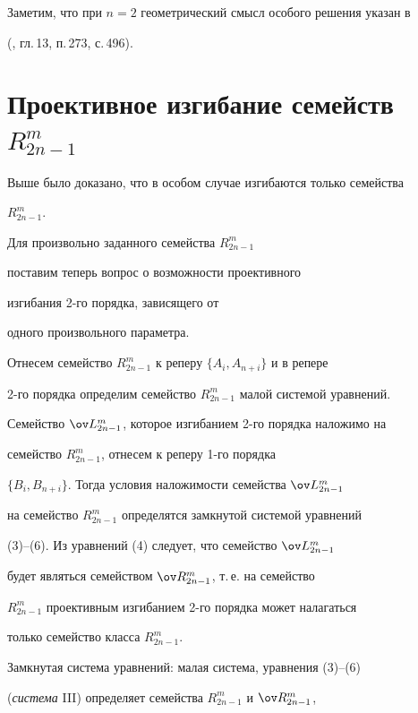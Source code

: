  


Заметим, что при $n=2$ геометрический смысл особого решения указан в 


(\cite{4}, гл.\,13, п.\,273, с.\,496). 


 


\section{Проективное изгибание семейств $R^m_{2n-1}$} 


 


Выше было доказано, что в особом случае изгибаются только семейства 


$R^m_{2n-1}$.


Для произвольно заданного семейства $R^m_{2n-1}$ 


поставим теперь вопрос о возможности проективного 


изгибания 2-го порядка, зависящего от


одного произвольного параметра. 


 


Отнесем семейство $R^m_{2n-1}$ к реперу $\{A_i,A_{n+i}\}$ и в репере 


2-го порядка определим семейство $R^m_{2n-1}$ малой системой уравнений. 


Семейство $\ov L^m_{2n-1}$, которое изгибанием 2-го порядка наложимо на 


семейство $R^m_{2n-1}$, отнесем к реперу 1-го порядка 


$\{B_i,B_{n+i}\}$. Тогда условия наложимости семейства $\ov L^m_{2n-1}$ 


на семейство $R^m_{2n-1}$ определятся замкнутой системой уравнений


(3)--(6). Из уравнений (4) следует, что семейство $\ov L^m_{2n-1}$ 


будет являться семейством $\ov R^m_{2n-1}$, т.\,е. на семейство 


$R^m_{2n-1}$ проективным изгибанием 2-го порядка может налагаться 


только семейство класса $R^m_{2n-1}$. 


 


Замкнутая система уравнений: малая система, уравнения (3)--(6)


({\it система} III) определяет семейства $R^m_{2n-1}$ и $\ov R^m_{2n-1}$, 


